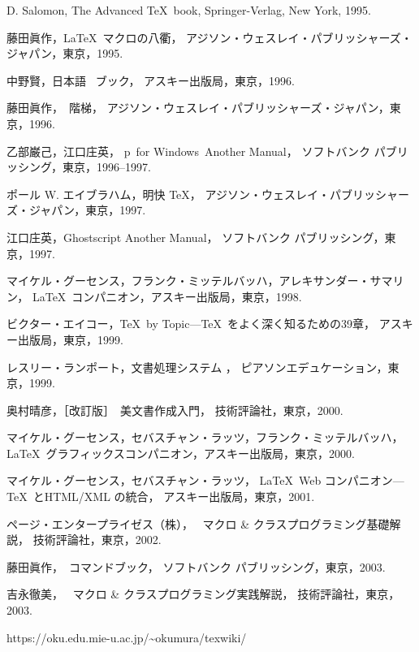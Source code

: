 \documentclass[paper]{ieicej}
\begin{document}
\begin{thebibliography}{99}
D. Salomon, The Advanced \TeX\ book,
Springer-Verlag, New York, 1995.

藤田眞作，\LaTeX\ マクロの八衢，
アジソン・ウェスレイ・パブリッシャーズ・ジャパン，東京，1995.

中野賢，日本語 \LaTeXe\ ブック，
アスキー出版局，東京，1996.

藤田眞作，\LaTeXe\ 階梯，
アジソン・ウェスレイ・パブリッシャーズ・ジャパン，東京，1996.

乙部巌己，江口庄英，
p\LaTeXe\ for Windows\ Another Manual，
ソフトバンク パブリッシング，東京，1996--1997.

ポール W. エイブラハム，明快 \TeX{}，
アジソン・ウェスレイ・パブリッシャーズ・ジャパン，東京，1997.

江口庄英，Ghostscript Another Manual，
ソフトバンク パブリッシング，東京，1997.

マイケル・グーセンス，フランク・ミッテルバッハ，アレキサンダー・サマリン，
\LaTeX\ コンパニオン，アスキー出版局，東京，1998.

ビクター・エイコー，\TeX\ by Topic---\TeX\ をよく深く知るための39章，
アスキー出版局，東京，1999.

レスリー・ランポート，文書処理システム \LaTeXe{}，
ピアソンエデュケーション，東京，1999.

奥村晴彦，［改訂版］\LaTeXe\ 美文書作成入門，
技術評論社，東京，2000.

マイケル・グーセンス，セバスチャン・ラッツ，フランク・ミッテルバッハ，
\LaTeX\ グラフィックスコンパニオン，アスキー出版局，東京，2000.

マイケル・グーセンス，セバスチャン・ラッツ，
\LaTeX\ Web コンパニオン---\TeX\ とHTML/XML の統合，
アスキー出版局，東京，2001.

ページ・エンタープライゼス\<（株）\<，
\LaTeXe\ マクロ \& クラスプログラミング基礎解説，
技術評論社，東京，2002.

藤田眞作，\LaTeXe\ コマンドブック，
ソフトバンク パブリッシング，東京，2003.

吉永徹美，
\LaTeXe\ マクロ \& クラスプログラミング実践解説，
技術評論社，東京，2003.

https://oku.edu.mie-u.ac.jp/\~{}okumura/texwiki/
\end{thebibliography}
\end{document}
